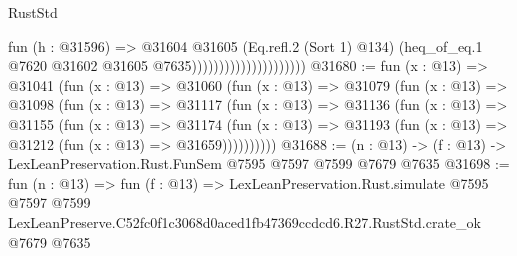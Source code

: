 \begin{lexlean}{RustStd}
\begin{coremodule}
                                          fun (h : @31596) =>
                                          @31604
                                            @31605
                                            (Eq.refl.{2} (Sort 1) @134)
                                            (heq_of_eq.{1}
                                              @7620
                                              @31602
                                              @31605
                                              @7635)))))))))))))))))))))
@31680 := fun (x : @13) =>
  @31041
    (fun (x : @13) =>
    @31060
      (fun (x : @13) =>
      @31079
        (fun (x : @13) =>
        @31098
          (fun (x : @13) =>
          @31117
            (fun (x : @13) =>
            @31136
              (fun (x : @13) =>
              @31155
                (fun (x : @13) =>
                @31174
                  (fun (x : @13) =>
                  @31193 (fun (x : @13) => @31212 (fun (x : @13) => @31659))))))))))
@31688 := (n : @13) -> (f : @13) -> LexLeanPreservation.Rust.FunSem @7595 @7597 @7599 @7679 @7635
@31698 := fun (n : @13) =>
  fun (f : @13) =>
  LexLeanPreservation.Rust.simulate
    @7595
    @7597
    @7599
    LexLeanPreserve.C52fc0f1c3068d0aced1fb47369ccdcd6.R27.RustStd.crate_ok
    @7679
    @7635
\end{coremodule}
\end{lexlean}
